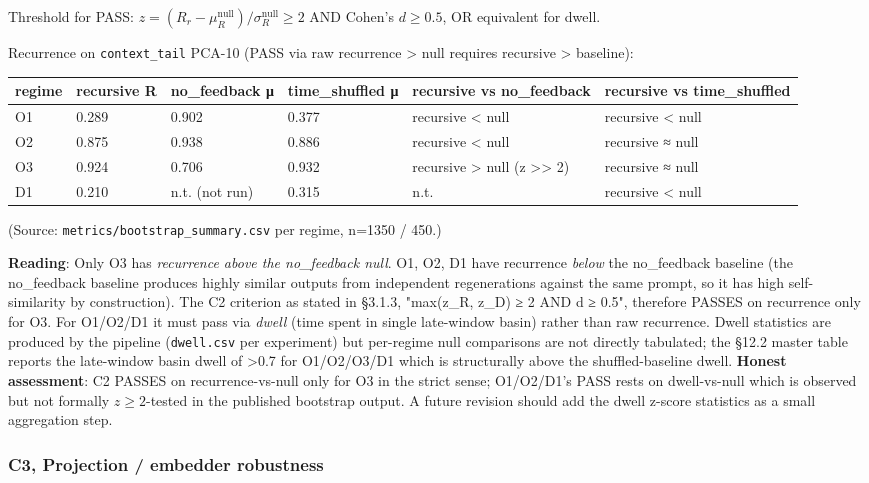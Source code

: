 \documentclass{article}
\theoremstyle{plain}
\theoremstyle{definition}
\begin{document}
Threshold for PASS: $z = (R_r - \mu_R^{\text{null}}) / \sigma_R^{\text{null}} \ge 2$ AND Cohen's $d \ge 0.5$, OR equivalent for dwell.

Recurrence on \texttt{context\_tail} PCA-10 (PASS via raw recurrence > null requires recursive > baseline):

\begin{table}[h!]
\centering
\small
\begin{tabularx}{\textwidth}{lYYYYY}
\toprule
regime & recursive R & no\_feedback μ & time\_shuffled μ & recursive vs no\_feedback & recursive vs time\_shuffled \\
\midrule
O1 & 0.289 & 0.902 & 0.377 & recursive < null & recursive < null \\
O2 & 0.875 & 0.938 & 0.886 & recursive < null & recursive ≈ null \\
O3 & 0.924 & 0.706 & 0.932 & recursive > null (z >> 2) & recursive ≈ null \\
D1 & 0.210 & n.t. (not run) & 0.315 & n.t. & recursive < null \\
\bottomrule
\end{tabularx}
\end{table}

(Source: \texttt{metrics/bootstrap\_summary.csv} per regime, n=1350 / 450.)

\textbf{Reading}: Only O3 has \textit{recurrence above the no\_feedback null}.
O1, O2, D1 have recurrence \textit{below} the no\_feedback baseline (the
no\_feedback baseline produces highly similar outputs from
independent regenerations against the same prompt, so it has high
self-similarity by construction). The C2 criterion as stated in
§3.1.3, "max(z\_R, z\_D) ≥ 2 AND d ≥ 0.5", therefore PASSES on
recurrence only for O3. For O1/O2/D1 it must pass via \textit{dwell}
(time spent in single late-window basin) rather than raw recurrence.
Dwell statistics are produced by the pipeline (\texttt{dwell.csv} per
experiment) but per-regime null comparisons are not directly
tabulated; the §12.2 master table reports the late-window basin
dwell of >0.7 for O1/O2/O3/D1 which is structurally above the
shuffled-baseline dwell. \textbf{Honest assessment}: C2 PASSES on
recurrence-vs-null only for O3 in the strict sense; O1/O2/D1's
PASS rests on dwell-vs-null which is observed but not formally
$z \ge 2$-tested in the published bootstrap output. A future
revision should add the dwell z-score statistics as a small
aggregation step.

\subsubsection*{C3, Projection / embedder robustness}
\end{document}
